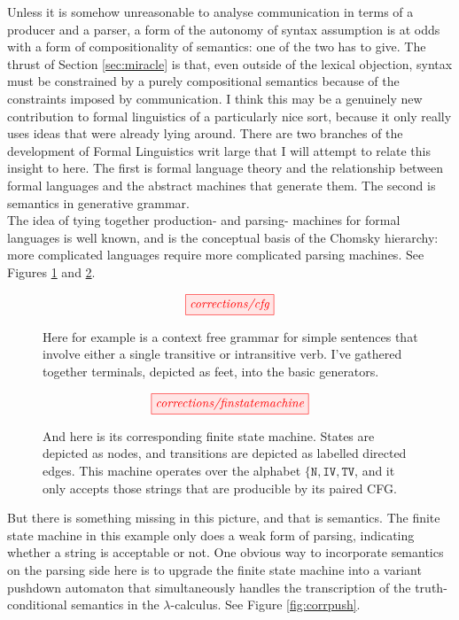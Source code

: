 Unless it is somehow unreasonable to analyse communication in terms of a producer and a parser, a form of the autonomy of syntax assumption is at odds with a form of compositionality of semantics: one of the two has to give. The thrust of Section \ref{sec:miracle} is that, even outside of the lexical objection, syntax must be constrained by a purely compositional semantics because of the constraints imposed by communication. I think this may be a genuinely new contribution to formal linguistics of a particularly nice sort, because it only really uses ideas that were already lying around. There are two branches of the development of Formal Linguistics writ large that I will attempt to relate this insight to here. The first is formal language theory and the relationship between formal languages and the abstract machines that generate them. The second is semantics in generative grammar.\\

The idea of tying together production- and parsing- machines for formal languages is well known, and is the conceptual basis of the Chomsky hierarchy: more complicated languages require more complicated parsing machines. See Figures \ref{fig:corrcfg} and \ref{fig:corrfinstate}.

\begin{figure}\label{fig:corrcfg}
\centering
\[\tikzfig{corrections/cfg}\]
\caption{Here for example is a context free grammar for simple sentences that involve either a single transitive or intransitive verb. I've gathered together terminals, depicted as feet, into the basic generators.}
\end{figure}

\clearpage

\begin{figure}\label{fig:corrfinstate}
\centering
\[\tikzfig{corrections/finstatemachine}\]
\caption{And here is its corresponding finite state machine. States are depicted as nodes, and transitions are depicted as labelled directed edges. This machine operates over the alphabet $\{ \texttt{N}, \texttt{IV}, \texttt{TV}$, and it only accepts those strings that are producible by its paired CFG.}
\end{figure}

But there is something missing in this picture, and that is semantics. The finite state machine in this example only does a weak form of parsing, indicating whether a string is acceptable or not. One obvious way to incorporate semantics on the parsing side here is to upgrade the finite state machine into a variant pushdown automaton that simultaneously handles the transcription of the truth-conditional semantics in the $\lambda$-calculus. See Figure \ref{fig:corrpush}.

